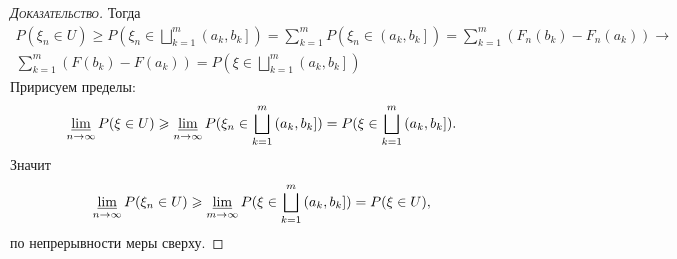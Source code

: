 \documentclass[../main.tex]{subfiles}
\begin{document}
\begin{proof}[\normalfont\textsc{Доказательство}]
 Тогда
 \begin{align*}
  P(\xi_n \in U) \geqslant P(\xi_n \in \bigsqcup_{k=1}^{m} \left(a_k, b_k\right]  ) = \sum_{k=1}^{m}P(\xi_n \in \left(a_k, b_k\right]  ) = \sum_{k=1}^{m}(F_n(b_k) - F_n(a_k)) \to \\
  \sum_{k=1}^{m}(F(b_k)-F(a_k)) = P(\xi \in \bigsqcup_{k=1}^{m}\left(a_k, b_k\right]  )
 \end{align*} Пририсуем пределы:
 \begin{align*}
  \varliminf_{n \to \infty} P(\xi \in U) \geqslant \varliminf_{n \to \infty} P(\xi_n \in \bigsqcup_{k=1}^{m}\left(a_k, b_k\right]  ) = P(\xi \in \bigsqcup_{k=1}^{m}\left(a_k, b_k\right]  ).
 \end{align*} Значит
 \begin{align*}
  \varliminf_{n \to \infty} P(\xi_n \in U) \geqslant \varliminf_{m \to \infty} P(\xi \in \bigsqcup_{k=1}^{m} \left(a_k, b_k\right]  ) = P(\xi \in U),
 \end{align*} по непрерывности меры сверху.


\end{proof}
\end{document}

